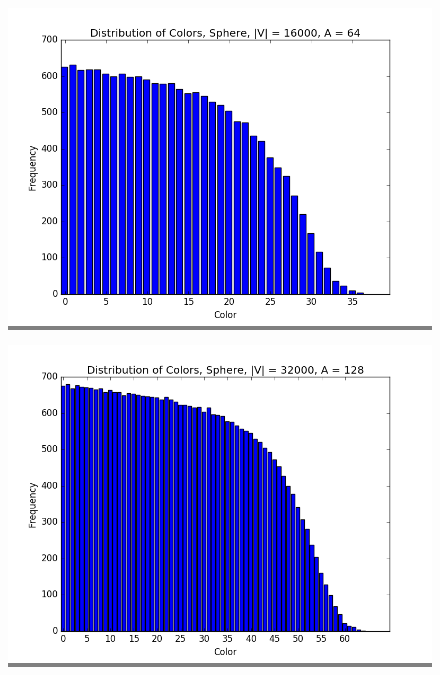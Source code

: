\documentclass{article}
\begin{document}
\begin{figure}
    \begin{minipage}{0.45\textwidth}
    \colorbox{gray}{\includegraphics[width=\linewidth]{./graphs/hist_colors_sphere_0.png}}
    \end{minipage}
    \hspace{\fill}
    \begin{minipage}{0.45\textwidth}
    \colorbox{gray}{\includegraphics[width=\linewidth]{./graphs/hist_colors_sphere_1.png}}
    \end{minipage}
    \vskip 0.25in
    \begin{minipage}{0.45\textwidth}

\end{minipage}
\end{figure}
\end{document}
